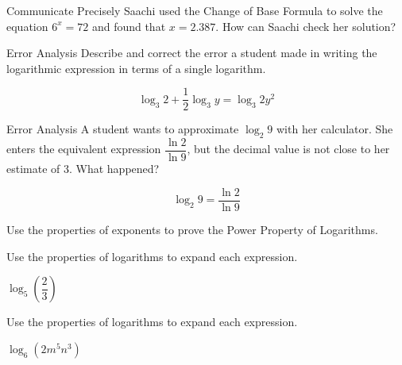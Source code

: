 \documentclass{article}
\newenvironment{practice}[2]{}{}        %
\newcommand{\answer}[1]{}               %
\begin{document}
\begin{practice}{10}{2}
Communicate Precisely Saachi used the Change of Base Formula to solve the equation $6^x=72$ and found that $x=2.387$. How can Saachi check her solution?

\answer{Saachi can check if $6^{2.387}=72$.}
\end{practice}

\begin{practice}{11}{2}
Error Analysis Describe and correct the error a student made in writing the logarithmic expression in terms of a single logarithm.

\[
\log_3 2+\frac{1}{2}\log_3 y=\log_3 2y^2
\]

\answer{The student used 2 as an exponent instead of $\frac{1}{2}$. The correct expression is $\log_3(2y^{1/2})$.}
\end{practice}

\begin{practice}{12}{2}
Error Analysis A student wants to approximate $\log_2 9$ with her calculator. She enters the equivalent expression $\dfrac{\ln2}{\ln9}$, but the decimal value is not close to her estimate of 3. What happened?

\[
\log_2 9=\frac{\ln2}{\ln9}
\]

\answer{The student applied the change of base property incorrectly.}
\end{practice}

\begin{practice}{13}{3}
Use the properties of exponents to prove the Power Property of Logarithms.

\answer{Let \(\log_b(m^n)=x\). \(\begin{aligned} b^x&=m^n\\ (b^x)^{1/n}&=(m^n)^{1/n}\\ b^{x/n}&=m\\ \frac{x}{n}&=\log_b m\\ x&=n\log_b m\\ \log_b(m^n)&=n\log_b(m)\end{aligned}\)}
\end{practice}

\begin{practice}{14}{1}
Use the properties of logarithms to expand each expression.

$\log_5\left(\dfrac{2}{3}\right)$

\answer{$\log_5 2-\log_5 3$}
\end{practice}

\begin{practice}{15}{1}
Use the properties of logarithms to expand each expression.

$\log_6(2m^5n^3)$

\answer{$\log_6 2+5\log_6 m+3\log_6 n$}
\end{practice}
\end{document}
